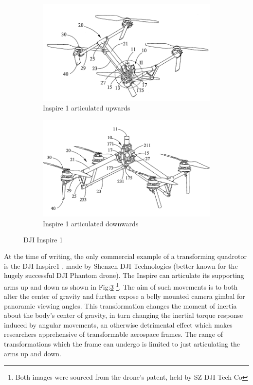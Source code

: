 \begin{figure}[hbtp]
\centering
\begin{subfigure}{.5\textwidth}
\centering
\includegraphics[width=\textwidth]{figs/dji-inspire1}
\caption{Inspire 1 articulated upwards}
\label{fig:inspireup}
\end{subfigure}%
\begin{subfigure}{.5\textwidth}
\centering
\includegraphics[width=\textwidth]{figs/dji-inspire2}
\caption{Inspire 1 articulated downwards}
\label{fig:inspiredown}
\end{subfigure}
\caption{DJI Inspire 1}
\label{fig:inspire1}
\end{figure}
At the time of writing, the only commercial example of a transforming quadrotor is the DJI Inspire1 \cite{inspire}, made by Shenzen DJI Technologies (better known for the hugely successful DJI Phantom drone\cite{phantom}). The Inspire can articulate its supporting arms up and down as shown in Fig:\ref{fig:inspire1} \footnote{Both images were sourced from the drone's patent, held by SZ DJI Tech Co\cite{djinspire}}. The aim of such movements is to both alter the center of gravity and further expose a belly mounted camera gimbal for panoramic viewing angles. This transformation changes the moment of inertia about the body's center of gravity, in turn changing the inertial torque response induced by angular movements, an otherwise detrimental effect which makes researchers apprehensive of transformable aerospace frames. The range of transformations which the frame can undergo is limited to just articulating the arms up and down.
